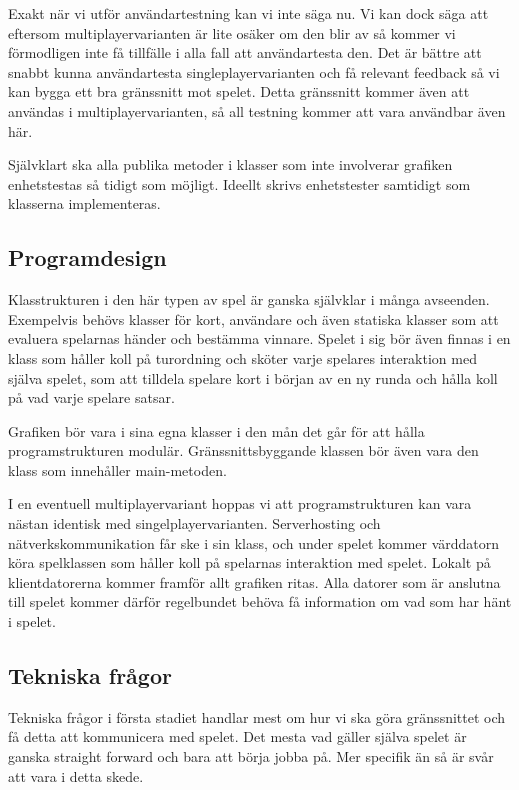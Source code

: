 \documentclass[10pt,twoside,a4paper]{article}
\begin{document}
Exakt när vi utför användartestning kan vi inte säga nu. Vi kan dock säga
att eftersom multiplayervarianten är lite osäker om den blir av så kommer
vi förmodligen inte få tillfälle i alla fall att användartesta den. Det är
bättre att snabbt kunna användartesta singleplayervarianten och få relevant
feedback så vi kan bygga ett bra gränssnitt mot spelet. Detta gränssnitt
kommer även att användas i multiplayervarianten, så all testning kommer att
vara användbar även här.

Självklart ska alla publika metoder i klasser som inte involverar grafiken
enhetstestas så tidigt som möjligt. Ideellt skrivs enhetstester samtidigt
som klasserna implementeras.

\subsection*{Programdesign}

Klasstrukturen i den här typen av spel är ganska självklar i många
avseenden. Exempelvis behövs klasser för kort, användare och även statiska
klasser som att evaluera spelarnas händer och bestämma vinnare. Spelet i
sig bör även finnas i en klass som håller koll på turordning och sköter
varje spelares interaktion med själva spelet, som att tilldela spelare kort
i början av en ny runda och hålla koll på vad varje spelare satsar.

Grafiken bör vara i sina egna klasser i den mån det går för att hålla
programstrukturen modulär. Gränssnittsbyggande klassen bör även vara den
klass som innehåller main-metoden.

I en eventuell multiplayervariant hoppas vi att programstrukturen kan vara
nästan identisk med singelplayervarianten. Serverhosting och
nätverkskommunikation får ske i sin klass, och under spelet kommer
värddatorn köra spelklassen som håller koll på spelarnas interaktion med
spelet. Lokalt på klientdatorerna kommer framför allt grafiken ritas. Alla
datorer som är anslutna till spelet kommer därför regelbundet behöva få
information om vad som har hänt i spelet.

\subsection*{Tekniska frågor}

Tekniska frågor i första stadiet handlar mest om hur vi ska göra
gränssnittet och få detta att kommunicera med spelet. Det mesta vad gäller
själva spelet är ganska straight forward och bara att börja jobba på. Mer
specifik än så är svår att vara i detta skede.
\end{document}
